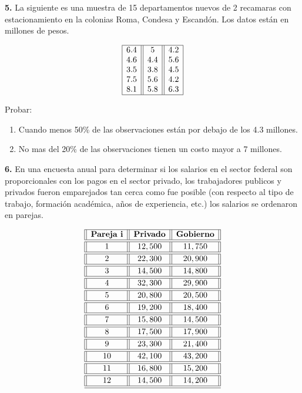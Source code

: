 \documentclass[
  a4paper,
  oneside,
  openany]{book}
\begin{document}
\textbf{5.} La siguiente es una muestra de 15 departamentos nuevos de 2 recamaras con estacionamiento en la colonias Roma, Condesa y Escandón. Los datos están en millones de pesos.

\[
\begin{array}{|c| |c| |c|} 
\hline
6.4&    5&  4.2\\
4.6&    4.4&    5.6\\
3.5&    3.8&    4.5\\
7.5&    5.6&    4.2\\
8.1&    5.8&    6.3\\
\hline
\end{array}
\]

Probar:

\begin{enumerate}
\def\labelenumi{\alph{enumi})}
\item
  Cuando menos 50\% de las observaciones están por debajo de los 4.3 millones.
\item
  No mas del 20\% de las observaciones tienen un costo mayor a 7 millones.
\end{enumerate}

\textbf{6.} En una encuesta anual para determinar si los salarios en el sector federal son proporcionales con los pagos en el sector privado, los trabajadores publicos y privados fueron emparejados tan cerca como fue posible (con respecto al tipo de trabajo, formación académica, años de experiencia, etc.) los salarios se ordenaron en parejas.

\[
\begin{array}{||c| |c| |c||} 
\hline 
\textbf{Pareja i}  & \textbf{Privado} & \textbf{Gobierno} \\ 
\hline
\hline
1 &12,500& 11,750 \\
\hline
\hline
2& 22,300 &20,900 \\
\hline
\hline
3 &14,500 &14,800 \\
\hline
\hline
4 &32,300 &29,900 \\
\hline
\hline
5 &20,800 &20,500 \\
\hline
\hline
6 &19,200 &18,400 \\
\hline
\hline
7 &15,800 &14,500 \\
\hline
\hline
8 &17,500 &17,900 \\
\hline
\hline
9 &23,300 &21,400 \\
\hline
\hline
10 &42,100 &43,200 \\
\hline
\hline
11 &16,800 &15,200 \\
\hline
\hline
12& 14,500 &14,200 \\
\hline
\hline
\end{array}
\]
\end{document}

